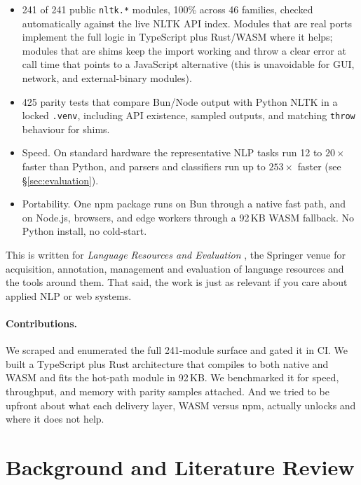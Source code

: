 \documentclass[smallextended]{svjour3}
\begin{document}
\begin{itemize}[leftmargin=1.2em,itemsep=1pt]
  \item 241 of 241 public \texttt{nltk.*} modules, 100\% across 46 families, checked automatically against the live NLTK API index. Modules that are real ports implement the full logic in TypeScript plus Rust/WASM where it helps; modules that are shims keep the import working and throw a clear error at call time that points to a JavaScript alternative (this is unavoidable for GUI, network, and external-binary modules).
  \item 425 parity tests that compare Bun/Node output with Python NLTK in a locked \texttt{.venv}, including API existence, sampled outputs, and matching \texttt{throw} behaviour for shims.
  \item Speed. On standard hardware the representative NLP tasks run 12 to $20\times$ faster than Python, and parsers and classifiers run up to $253\times$ faster (see \S\ref{sec:evaluation}).
  \item Portability. One npm package runs on Bun through a native fast path, and on Node.js, browsers, and edge workers through a 92\,KB WASM fallback. No Python install, no cold-start.
\end{itemize}

This is written for \emph{Language Resources and Evaluation} \cite{nltk2024}, the Springer venue for acquisition, annotation, management and evaluation of language resources and the tools around them. That said, the work is just as relevant if you care about applied NLP or web systems.

\paragraph{Contributions.}
We scraped and enumerated the full 241-module surface and gated it in CI. We built a TypeScript plus Rust architecture that compiles to both native and WASM and fits the hot-path module in 92\,KB. We benchmarked it for speed, throughput, and memory with parity samples attached. And we tried to be upfront about what each delivery layer, WASM versus npm, actually unlocks and where it does not help.

\section{Background and Literature Review}
\label{sec:related}
\end{document}
